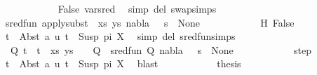 \begin{isabellebody}
\ \ \ \ \ \ \ \ \ \ \isamarkupfalse%
\ False\ var{\isacharunderscore}{\kern0pt}{}{\isacharunderscore}{\kern0pt}sred\ \isamarkupfalse%
\ {\isacharparenleft}{\kern0pt}simp\ del{\isacharcolon}{\kern0pt}\ swap{\isachardot}{\kern0pt}simps{\isacharparenright}{\kern0pt}\isanewline
\ \ \ \ \ \ \ \ \isamarkupfalse%
\ {\isachardoublequoteopen}sred{\isacharunderscore}{\kern0pt}fun\ {\isacharparenleft}{\kern0pt}apply{\isacharunderscore}{\kern0pt}subst\ {\isacharquery}{\kern0pt}{\isasymsigma}\ {\isacharparenleft}{\kern0pt}xs{\isacharcomma}{\kern0pt}\ ys{\isacharparenright}{\kern0pt}{\isacharcomma}{\kern0pt}\ nabla{\isacharcomma}{\kern0pt}\ {\isacharquery}{\kern0pt}{\isasymsigma}\ {\isasymbullet}\ s{\isacharparenright}{\kern0pt}\ {\isacharequal}{\kern0pt}\ None{\isachardoublequoteclose}\isanewline
\ \ \ \ \ \ \ \ \ \ \isamarkupfalse%
\ H\ False\ \isamarkupfalse%
\ {\isacartoucheopen}t{}\ {\isacharequal}{\kern0pt}\ Abst\ a\ u{\isacartoucheclose}\ {\isacartoucheopen}t{}\ {\isacharequal}{\kern0pt}\ Susp\ pi\ X{\isacartoucheclose}\ \isamarkupfalse%
\ {\isacharparenleft}{\kern0pt}simp\ del{\isacharcolon}{\kern0pt}\ sred{\isacharunderscore}{\kern0pt}fun{\isachardot}{\kern0pt}simps{\isacharparenright}{\kern0pt}\isanewline
\ \ \ \ \ \ \ \ \isamarkupfalse%
\ \isamarkupfalse%
\ {\isachardoublequoteopen}{\isasymexists}{\isasymsigma}\ Q{\isachardot}{\kern0pt}\ {\isacharparenleft}{\kern0pt}{\isacharparenleft}{\kern0pt}t{}\ {\isasymapprox}{\isacharquery}{\kern0pt}\ t{}{\isacharparenright}{\kern0pt}\ {\isacharhash}{\kern0pt}\ xs{\isacharcomma}{\kern0pt}\ ys{\isacharparenright}{\kern0pt}\ {\isasymturnstile}\ {\isasymsigma}\ {\isasymleadsto}\ Q\ {\isasymand}\ sred{\isacharunderscore}{\kern0pt}fun\ {\isacharparenleft}{\kern0pt}Q{\isacharcomma}{\kern0pt}\ nabla{\isacharcomma}{\kern0pt}\ {\isasymsigma}\ {\isasymbullet}\ s{\isacharparenright}{\kern0pt}\ {\isacharequal}{\kern0pt}\ None{\isachardoublequoteclose}\isanewline
\ \ \ \ \ \ \ \ \ \ \isamarkupfalse%
\ step\ \isamarkupfalse%
\ {\isacartoucheopen}t{}\ {\isacharequal}{\kern0pt}\ Abst\ a\ u{\isacartoucheclose}\ {\isacartoucheopen}t{}\ {\isacharequal}{\kern0pt}\ Susp\ pi\ X{\isacartoucheclose}\ \isamarkupfalse%
\ blast\isanewline
\ \ \ \ \ \ \ \ \isamarkupfalse%
\ \isamarkupfalse%
\ {\isacharquery}{\kern0pt}thesis\ \isamarkupfalse%

\end{isabellebody}
